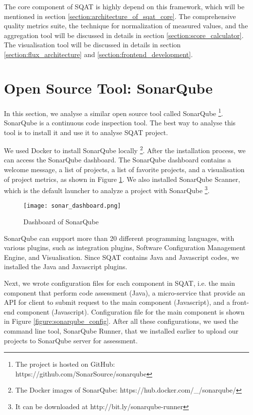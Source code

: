 The core component of SQAT is highly depend on this framework, which will be mentioned in section \ref{section:architecture_of_sqat_core}. The comprehensive quality metrics suite, the technique for normalization of measured values, and the aggregation tool will be discussed in details in section \ref{section:score_calculator}. The visualisation tool will be discussed in details in section \ref{section:flux_architecture} and \ref{section:frontend_development}. 

\section{Open Source Tool: SonarQube}

In this section, we analyse a similar open source tool called SonarQube \footnote{The project is hosted on GitHub: https://github.com/SonarSource/sonarqube}. SonarQube is a continuous code inspection tool. The best way to analyse this tool is to install it and use it to analyse SQAT project. 

We used Docker to install SonarQube locally \footnote{The Docker images of SonarQube: https://hub.docker.com/\_/sonarqube/}. After the installation process, we can access the SonarQube dashboard. The SonarQube dashboard contains a welcome message, a list of projects, a list of favorite projects, and a visualisation of project metrics, as shown in Figure \ref{figure:sonar_dashboard}. We also installed SonarQube Scanner, which is the default launcher to analyze a project with SonarQube \footnote{It can be downloaded at http://bit.ly/sonarqube-runner}.

\begin{figure}[t]
    \centering
    \texttt{[image: sonar\_dashboard.png]}
    \caption{Dashboard of SonarQube}
    \label{figure:sonar_dashboard}
\end{figure}

SonarQube can support more than 20 different programming languages, with various plugins, such as integration plugins, Software Configuration Management Engine, and Visualisation. Since SQAT contains Java and Javascript codes, we installed the Java and Javascript plugins. 

Next, we wrote configuration files for each component in SQAT, i.e. the main component that perform code assessment (Java), a micro-service that provide an API for client to submit request to the main component (Javascript), and a front-end component (Javascript). Configuration file for the main component is shown in Figure \ref{figure:sonarqube_config}. After all these configurations, we used the command line tool, SonarQube Runner, that we installed earlier to upload our projects to SonarQube server for assessment. 

